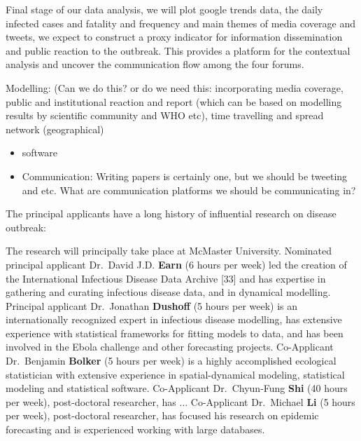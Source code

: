 Final stage of our data analysis,  we will plot google trends data, the daily infected cases and fatality and frequency and main themes of media coverage and tweets,  we expect to construct a proxy indicator for information dissemination and public reaction to the outbreak.  This provides a platform for the contextual analysis and uncover the communication flow among the four forums.



Modelling: (Can we do this? or do we need this: incorporating media coverage, public and institutional reaction and report (which can be based on modelling results by scientific community and WHO etc), time travelling and spread network (geographical)


\begin{itemize}
\item{software}
\item{Communication: Writing papers is certainly one, but we should be tweeting and etc. What are communication platforms we should be communicating in?}
\end{itemize}



The principal applicants have a long history of influential research on disease outbreak: 

The research will principally take place at McMaster University. 
Nominated principal applicant Dr.\ David J.D. \textbf{Earn} (6 hours per week) led the creation of the International Infectious Disease Data Archive [33] and has expertise in gathering and curating infectious disease data, and in dynamical modelling.
Principal applicant Dr.\ Jonathan \textbf{Dushoff} (5 hours per week) is an internationally recognized expert in infectious disease modelling, has extensive experience with statistical frameworks for fitting models to data, and has been involved in the Ebola challenge and other forecasting projects. 
Co-Applicant Dr.\ Benjamin \textbf{Bolker} (5 hours per week) is a highly accomplished ecological statistician with extensive experience in spatial-dynamical modeling, statistical modeling and statistical software.
Co-Applicant Dr.\ Chyun-Fung \textbf{Shi} (40 hours per week), post-doctoral researcher, has ...
Co-Applicant Dr.\ Michael \textbf{Li} (5 hours per week), post-doctoral researcher, has focused his research on epidemic forecasting and is experienced working with large databases. 

